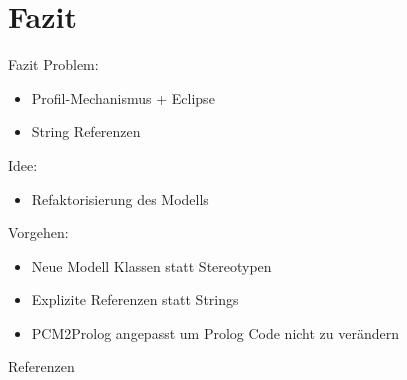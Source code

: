 \documentclass{sdqbeamer}
\begin{document}
\section{Fazit}
\begin{frame}{Fazit}
		Problem:
		\begin{itemize}
			\item Profil-Mechanismus + Eclipse
			\item String Referenzen
		\end{itemize}
		\vspace{0.025\textheight}
		Idee:
			\begin{itemize}
			\item Refaktorisierung des Modells
		\end{itemize}
		\vspace{0.025\textheight}
		Vorgehen:
		\begin{itemize}
		\item Neue Modell Klassen statt Stereotypen
		\item Explizite Referenzen statt Strings
		\item PCM2Prolog angepasst um Prolog Code nicht zu verändern
		\end{itemize}
	
\end{frame}

\begin{frame}{Referenzen}
	\nocite{*}
	\printbibliography
\end{frame}
\appendix
\beginbackup

\backupend
\end{document}

